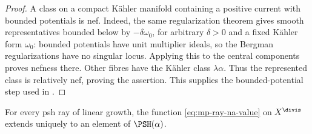 \begin{proof}
A class on a compact K\"ahler manifold containing a positive current with bounded potentials is nef. Indeed, the same regularization theorem gives smooth representatives bounded below by $-\delta\omega_0$, for arbitrary $\delta>0$ and a fixed K\"ahler form $\omega_0$: bounded potentials have unit multiplier ideals, so the Bergman regularizations have no singular locus. Applying this to the central components proves nefness there. Other fibres have the K\"ahler class $\lambda\alpha$. Thus the represented class is relatively nef, proving the assertion. This supplies the bounded-potential step used in \cite[Lemma~5.1.3]{MPTropicalV2}.
\end{proof}

\begin{theorem}\label{thm:mp-ray-to-na}
For every psh ray of linear growth, the function \eqref{eq:mp-ray-na-value} on $X^{\divis}$ extends uniquely to an element of $\PSH(\alpha)$.
\end{theorem}

